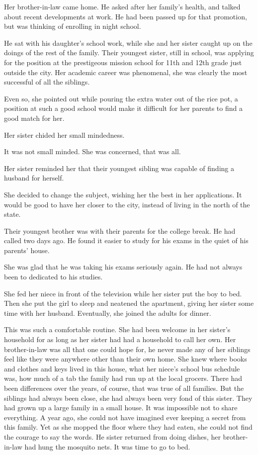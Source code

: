 \documentclass{article}
\begin{document}
Her brother-in-law came home. He asked after her family's health, and talked about recent developments at work. He had been passed up for that promotion, but was thinking of enrolling in night school. 

He sat with his daughter's school work, while she and her sister caught up on the doings of the rest of the family. Their youngest sister, still in school, was applying for the position at the prestigeous mission school for 11th and 12th grade just outside the city. Her academic career was phenomenal, she was clearly the most successful of all the siblings. 

Even so, she pointed out while pouring the extra water out of the rice pot, a position at such a good school would make it difficult for her parents to find a good match for her. 

Her sister chided her small mindedness. 

It was not small minded. She was concerned, that was all. 

Her sister reminded her that their youngest sibling was capable of finding a husband for herself. 

She decided to change the subject, wishing her the best in her applications. It would be good to have her closer to the city, instead of living in the north of the state. 

Their youngest brother was with their parents for the college break. He had called two days ago. He found it easier to study for his exams in the quiet of his parents' house. 

She was glad that he was taking his exams seriously again. He had not always been to dedicated to his studies.

She fed her niece in front of the television while her sister put the boy to bed. Then she put the girl to sleep and neatened the apartment, giving her sister some time with her husband. Eventually, she joined the adults for dinner.
 
This was such a comfortable routine. She had been welcome in her sister's household for as long as her sister had had a household to call her own. Her brother-in-law was all that one could hope for, he never made any of her siblings feel like they were anywhere other than their own home. She knew where books and clothes and keys lived in this house, what her niece's school bus schedule was, how much of a tab the family had run up at the local grocers. There had been differences over the years, of course, that was true of all families. But the siblings had always been close, she had always been very fond of this sister. They had grown up a large family in a small house. It was impossible not to share everything. A year ago, she could not have imagined ever keeping a secret from this family. Yet as she mopped the floor where they had eaten, she could not find the courage to say the words. He sister returned from doing dishes, her brother-in-law had hung the mosquito nets. It was time to go to bed.
\end{document}
